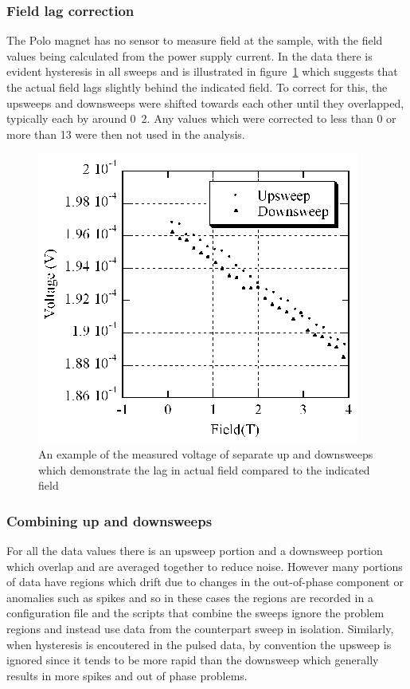 \subsubsection{Field lag correction}

The Polo magnet has no sensor to measure field at the sample, with the field values being calculated from the power supply current. In the data there is evident hysteresis in all sweeps and is illustrated in figure~\ref{Fig:Exp:PoloHysteresis} which suggests that the actual field lags slightly behind the indicated field. To correct for this, the upsweeps and downsweeps were shifted towards each other until they overlapped, typically each by around \unit{0.2}{\tesla}. Any values which were corrected to less than \unit{0}{\tesla} or more than \unit{13}{\tesla} were then not used in the analysis.
\begin{figure}[htbp]
    \begin{center}
        \includegraphics[scale=0.9]{Chapter-ExperimentalTechnique/Figures/PoloHysteresis/PoloHysteresis}
        \caption{An example of the measured voltage of separate up and downsweeps which demonstrate the lag in actual field compared to the indicated field}
        \label{Fig:Exp:PoloHysteresis}
    \end{center}
\end{figure}

\subsubsection{Combining up and downsweeps}

For all the data values there is an upsweep portion and a downsweep portion which overlap and are averaged together to reduce noise. However many portions of data have regions which drift due to changes in the out-of-phase component or anomalies such as spikes and so in these cases the regions are recorded in a configuration file and the scripts that combine the sweeps ignore the problem regions and instead use data from the counterpart sweep in isolation. Similarly, when hysteresis is encoutered in the pulsed data, by convention the upsweep is ignored since it tends to be more rapid than the downsweep which generally results in more spikes and out of phase problems.

